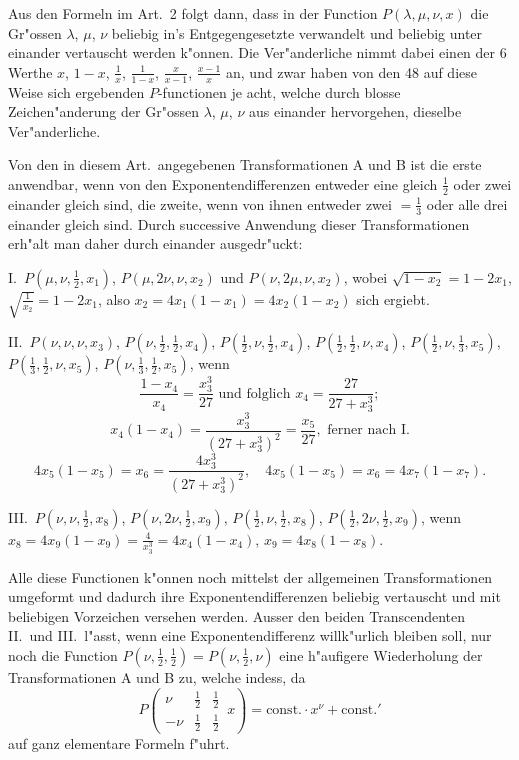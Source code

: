 \documentclass[12pt,a4paper]{article}
\begin{document}
Aus den Formeln im Art.~2 folgt dann, dass in der Function $P(\lambda, \mu, \nu, x)$ die Gr{"o}ssen $\lambda$, $\mu$, $\nu$ beliebig in's Entgegengesetzte verwandelt und beliebig unter einander vertauscht werden k{"o}nnen. Die Ver{"a}nderliche nimmt dabei einen der 6 Werthe $x$, $1 - x$, $\frac{1}{x}$, $\frac{1}{1-x}$, $\frac{x}{x-1}$, $\frac{x-1}{x}$ an, und zwar haben von den 48 auf diese Weise sich ergebenden $P$-functionen je acht, welche durch blosse Zeichen{"a}nderung der Gr{"o}ssen $\lambda$, $\mu$, $\nu$ aus einander hervorgehen, dieselbe Ver{"a}nderliche.

Von den in diesem Art.\ angegebenen Transformationen A und B ist die erste anwendbar, wenn von den Exponentendifferenzen entweder eine gleich $\frac{1}{2}$ oder zwei einander gleich sind, die zweite, wenn von ihnen entweder zwei $= \frac{1}{3}$ oder alle drei einander gleich sind. Durch successive Anwendung dieser Transformationen erh{"a}lt man daher durch einander ausgedr{"u}ckt:

I.\ $P(\mu, \nu, \frac{1}{2}, x_1)$, $P(\mu, 2\nu, \nu, x_2)$ und $P(\nu, 2\mu, \nu, x_2)$, wobei $\sqrt{1-x_2} = 1 - 2x_1$, $\sqrt{\frac{1}{x_2}} = 1 - 2x_1$, also $x_2 = 4x_1(1-x_1) = 4x_2(1-x_2)$ sich ergiebt.

II.\ $P(\nu, \nu, \nu, x_3)$, $P(\nu, \frac{1}{2}, \frac{1}{2}, x_4)$, $P(\frac{1}{2}, \nu, \frac{1}{2}, x_4)$, $P(\frac{1}{2}, \frac{1}{2}, \nu, x_4)$, $P(\frac{1}{2}, \nu, \frac{1}{3}, x_5)$, $P(\frac{1}{3}, \frac{1}{2}, \nu, x_5)$, $P(\nu, \frac{1}{3}, \frac{1}{2}, x_5)$, wenn
\[
\frac{1-x_4}{x_4} = \frac{x_3^3}{27} \text{ und folglich } x_4 = \frac{27}{27+x_3^3};
\]
\[
x_4(1-x_4) = \frac{x_3^3}{(27+x_3^3)^2} = \frac{x_5}{27}, \text{ ferner nach I.}
\]
\[
4x_5(1-x_5) = x_6 = \frac{4x_3^3}{(27+x_3^3)^2}, \quad 4x_5(1-x_5) = x_6 = 4x_7(1-x_7).
\]

III.\ $P(\nu, \nu, \frac{1}{2}, x_8)$, $P(\nu, 2\nu, \frac{1}{2}, x_9)$, $P(\frac{1}{2}, \nu, \frac{1}{2}, x_8)$, $P(\frac{1}{2}, 2\nu, \frac{1}{2}, x_9)$, wenn $x_8 = 4x_9(1-x_9) = \frac{4}{x_3^3} = 4x_4(1-x_4)$, $x_9 = 4x_8(1-x_8)$.

Alle diese Functionen k{"o}nnen noch mittelst der allgemeinen Transformationen umgeformt und dadurch ihre Exponentendifferenzen beliebig vertauscht und mit beliebigen Vorzeichen versehen werden. Ausser den beiden Transcendenten II.\ und III.\ l{"a}sst, wenn eine Exponentendifferenz willk{"u}rlich bleiben soll, nur noch die Function $P(\nu, \frac{1}{2}, \frac{1}{2}) = P(\nu, \frac{1}{2}, \nu)$ eine h{"a}ufigere Wiederholung der Transformationen A und B zu, welche indess, da
\[
P\left(\begin{array}{ccc|} \nu & \frac{1}{2} & \frac{1}{2} \\ -\nu & \frac{1}{2} & \frac{1}{2} \end{array}\, x\right) = \text{const.} \cdot x^{\nu} + \text{const.}'
\]
auf ganz elementare Formeln f{"u}hrt.
\end{document}

